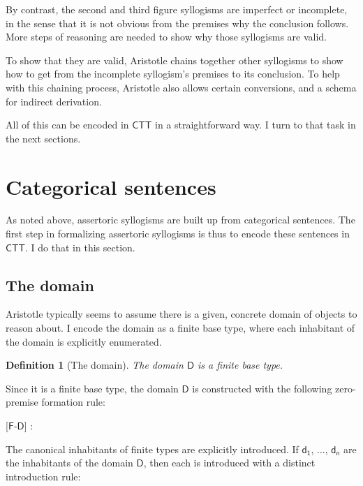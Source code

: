 \documentclass{article}
\newcommand\hypo{\Hypo}
\newcommand\infer{\Infer}
\newtheorem{definition}{Definition}
\newcommand\e{\mathsf}
\newcommand\subs[2]{\e{#1_{#2}}}
\def\CTT/{$\e{CTT}$}
\def\Type/{\e{*}}
\def\Domain/{\e{D}}
\def\FormSymbol/{$\e{F}$}
\newcommand\Form[1]{\FormSymbol/-$#1$}
\begin{document}
By contrast, the second and third figure syllogisms are imperfect or incomplete, in the sense that it is not obvious from the premises why the conclusion follows. More steps of reasoning are needed to show why those syllogisms are valid. 

To show that they are valid, Aristotle chains together other syllogisms to show how to get from the incomplete syllogism's premises to its conclusion. To help with this chaining process, Aristotle also allows certain conversions, and a schema for indirect derivation.

All of this can be encoded in \CTT/ in a straightforward way. I turn to that task in the next sections.


\section{Categorical sentences}

As noted above, assertoric syllogisms are built up from categorical sentences. The first step in formalizing assertoric syllogisms is thus to encode these sentences in \CTT/. I do that in this section.


\subsection{The domain}

Aristotle typically seems to assume there is a given, concrete domain of objects to reason about. I encode the domain as a finite base type, where each inhabitant of the domain is explicitly enumerated.

\begin{definition}[The domain]
  The domain $\Domain/$ is a finite base type. 
\end{definition}

Since it is a finite base type, the domain $\Domain/$ is constructed with the following zero-premise formation rule:

\begin{prooftree*}
  \hypo{}
  \infer1[\Form{\Domain/}]{\Domain/ : \Type/}
\end{prooftree*}
  
The canonical inhabitants of finite types are explicitly introduced. If $\subs{d}{1}$, $\ldots$, $\subs{d}{n}$ are the inhabitants of the domain $\Domain/$, then each is introduced with a distinct introduction rule:
  
\end{document}
